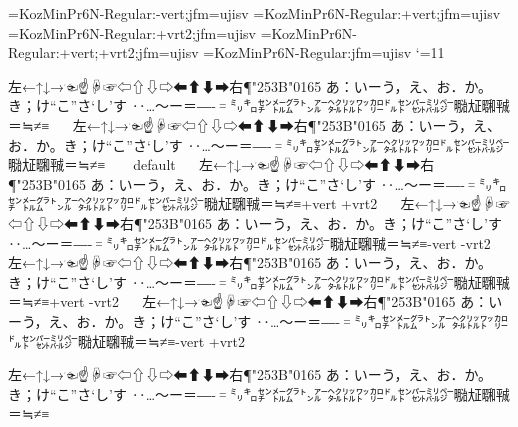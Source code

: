 
\def\FN{KozMinPr6N-Regular}
\hoffset-10mm
\voffset-10mm

\tfont\VN=\FN:-vert;jfm=ujisv
\tfont\VT=\FN:+vert;jfm=ujisv
\tfont\VU=\FN:+vrt2;jfm=ujisv
\tfont\VB=\FN:+vert;+vrt2;jfm=ujisv
\tfont\VD=\FN:jfm=ujisv
\tentt
{}
\catcode`\@=11
\parindent0pt

\def\TESTA{\leavevmode
\vbox{\hsize=21\zw\TEST}
\ \vrule\ 
\vbox{\hsize=210pt\VD\TEST \hfill\break\null\hfill~~~~default}
\ \vrule\ 
\vbox{\hsize=210pt\VB\TEST \hfill\break\null\hfill+vert +vrt2}
\ \vrule\ 
\vbox{\hsize=210pt\VN\TEST \hfill\break\null\hfill-vert -vrt2}
\ \vrule\ 
\vbox{\hsize=210pt\VT\TEST \hfill\break\null\hfill+vert -vrt2}
\ \vrule\ 
\vbox{\hsize=210pt\VU\TEST \hfill\break\null\hfill-vert +vrt2}
\par
\expandafter\@gobble\TEST\par}

\def\TEST{\tate
  左←↑↓→☜☝☟☞⇦⇧⇩⇨⬅⬆⬇➡右¶\ltjjachar"253B\ltjjachar"0165\relax
  あ：いーう，え、お．か。き；け“こ”さ‘し’す
  ‥…〜ー＝―‐゠㍉㌔㌢㍍㌘㌧㌃㌶㍑㍗㌍㌦㌣㌫㍊㌻㍾㍽㍼㍻＝≒≠≡}
\TESTA

\bye

